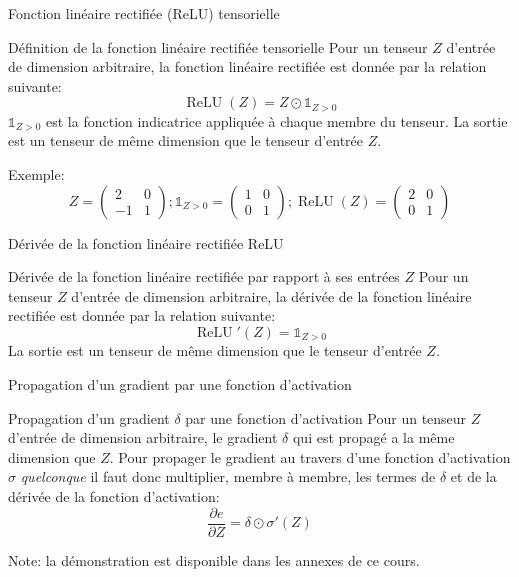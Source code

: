 \begin{frame}{Fonction linéaire rectifiée (ReLU) tensorielle}
	\begin{block}{Définition de la fonction linéaire rectifiée tensorielle}
		Pour un tenseur $Z$ d'entrée de dimension arbitraire, la fonction linéaire rectifiée est donnée par la relation suivante:
		\begin{equation*}
			\operatorname{ReLU}(Z) = Z \odot \mathbb{1}_{Z > 0}
		\end{equation*}
		$\mathbb{1}_{Z > 0}$ est la fonction indicatrice appliquée à chaque membre du tenseur. La sortie est un tenseur de même dimension que le tenseur d'entrée $Z$.
	\end{block}
	\pause
	Exemple:
	\begin{equation*}
		Z = \begin{pmatrix}
			2 & 0 \\
			-1 & 1 
		\end{pmatrix}; 
		\mathbb{1}_{Z > 0} = \begin{pmatrix}
			1 & 0 \\
			0 & 1 
		\end{pmatrix};
		\operatorname{ReLU}(Z) = \begin{pmatrix}
		2 & 0 \\
		0 & 1 
		\end{pmatrix}
	\end{equation*}
\end{frame}

\begin{frame}{Dérivée de la fonction linéaire rectifiée ReLU}
	\begin{block}{Dérivée de la fonction linéaire rectifiée par rapport à ses entrées $Z$}
	Pour un tenseur $Z$ d'entrée de dimension arbitraire, la dérivée de la fonction linéaire rectifiée est donnée par la relation suivante:
	\begin{equation*}
		\operatorname{ReLU}'(Z) = \mathbb{1}_{Z > 0}
	\end{equation*}
	La sortie est un tenseur de même dimension que le tenseur d'entrée $Z$.		
\end{block}	
\end{frame}

\begin{frame}{Propagation d'un gradient par une fonction d'activation}
	\begin{block}{Propagation d'un gradient $\delta$ par une fonction d'activation}
		Pour un tenseur $Z$ d'entrée de dimension arbitraire, le gradient $\delta$ qui est propagé a la même dimension que $Z$. Pour propager le gradient au travers d'une fonction d'activation $\sigma$ \textit{quelconque} il faut donc multiplier, membre à membre, les termes de $\delta$ et de la dérivée de la fonction d'activation:
		\begin{equation*}
				\frac{\partial{e}}{\partial{Z}} = \delta \odot \sigma'(Z)
		\end{equation*}
	\end{block}
	Note: la démonstration est disponible dans les annexes de ce cours.
\end{frame}

